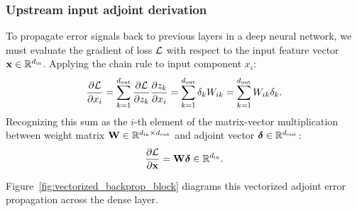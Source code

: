 \documentclass[../../main.tex]{subfiles}
\begin{document}
\subsubsection{Upstream input adjoint derivation}
To propagate error signals back to previous layers in a deep neural network, we must evaluate the gradient of loss $\mathcal{L}$ with respect to the input feature vector $\mathbf{x} \in \mathbb{R}^{d_{\text{in}}}$. Applying the chain rule to input component $x_i$:
\begin{equation}
\frac{\partial \mathcal{L}}{\partial x_i} = \sum_{k=1}^{d_{\text{out}}} \frac{\partial \mathcal{L}}{\partial z_k} \frac{\partial z_k}{\partial x_i} = \sum_{k=1}^{d_{\text{out}}} \delta_k W_{ik} = \sum_{k=1}^{d_{\text{out}}} W_{ik} \delta_k.
\end{equation}
Recognizing this sum as the $i$-th element of the matrix-vector multiplication between weight matrix $\mathbf{W} \in \mathbb{R}^{d_{\text{in}} \times d_{\text{out}}}$ and adjoint vector $\bm{\delta} \in \mathbb{R}^{d_{\text{out}}}$:
\begin{equation}
\label{eq:input_vector_gradient}
\frac{\partial \mathcal{L}}{\partial \mathbf{x}} = \mathbf{W} \bm{\delta} \in \mathbb{R}^{d_{\text{in}}}.
\end{equation}

Figure~\ref{fig:vectorized_backprop_block} diagrams this vectorized adjoint error propagation across the dense layer.
\end{document}
